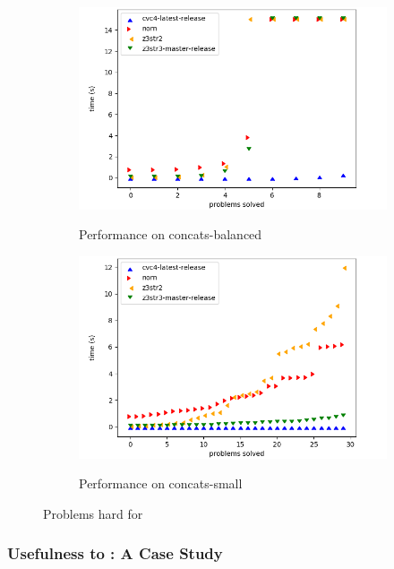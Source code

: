 \begin{figure}[h]
    \begin{subfigure}{.5\textwidth}
        \includegraphics[width=\textwidth]{data/graphs/concats-balanced.png}
        \label{fig:concats-balanced}
        \caption{Performance on concats-balanced}
    \end{subfigure}
    \begin{subfigure}{.5\textwidth}
        \includegraphics[width=\textwidth]{data/graphs/concats-small.png}
        \label{fig:concats-small}
        \caption{Performance on concats-small}
    \end{subfigure}
    \caption{Problems hard for \us{}}
    \label{fig:z3str3-hard}
\end{figure}

\subsubsection{Usefulness to \us{}: A Case Study}

